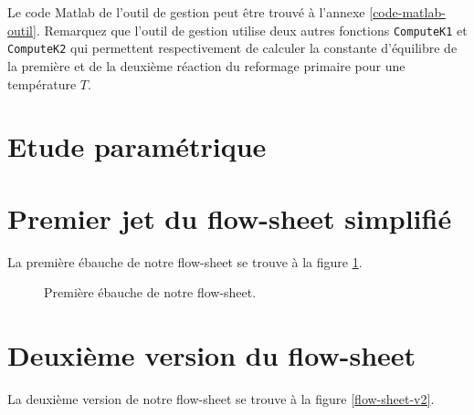 Le code Matlab de l'outil de gestion peut être trouvé à l'annexe \ref{code-matlab-outil}.
Remarquez que l'outil de gestion utilise deux autres fonctions \lstinline{ComputeK1}
et \lstinline{ComputeK2} qui permettent respectivement de calculer la constante
d'équilibre de la première et de la deuxième réaction du reformage primaire pour
une température $T$.

\section{Etude paramétrique}


\newpage
\annexe
\section{Premier jet du flow-sheet simplifié}
La première ébauche de notre flow-sheet se trouve à la figure \ref{flow-sheet}.

\begin{figure}[htb!]
	\centering
	\caption{Première ébauche de notre flow-sheet.}
	\label{flow-sheet}
\end{figure}
\newpage

\section{Deuxième version du flow-sheet}
\label{appendix:flow-sheet}
La deuxième version de notre flow-sheet se trouve à la figure \ref{flow-sheet-v2}.

